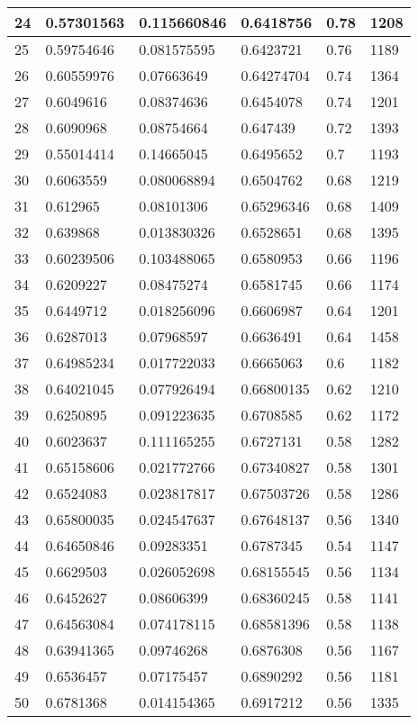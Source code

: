 \begin{longtable}{|l|l|l|l|l|l|}
24 & 0.57301563 & 0.115660846 & 0.6418756 & 0.78 & 1208 \\ \hline 
25 & 0.59754646 & 0.081575595 & 0.6423721 & 0.76 & 1189 \\ \hline 
26 & 0.60559976 & 0.07663649 & 0.64274704 & 0.74 & 1364 \\ \hline 
27 & 0.6049616 & 0.08374636 & 0.6454078 & 0.74 & 1201 \\ \hline 
28 & 0.6090968 & 0.08754664 & 0.647439 & 0.72 & 1393 \\ \hline 
29 & 0.55014414 & 0.14665045 & 0.6495652 & 0.7 & 1193 \\ \hline 
30 & 0.6063559 & 0.080068894 & 0.6504762 & 0.68 & 1219 \\ \hline 
31 & 0.612965 & 0.08101306 & 0.65296346 & 0.68 & 1409 \\ \hline 
32 & 0.639868 & 0.013830326 & 0.6528651 & 0.68 & 1395 \\ \hline 
33 & 0.60239506 & 0.103488065 & 0.6580953 & 0.66 & 1196 \\ \hline 
34 & 0.6209227 & 0.08475274 & 0.6581745 & 0.66 & 1174 \\ \hline 
35 & 0.6449712 & 0.018256096 & 0.6606987 & 0.64 & 1201 \\ \hline 
36 & 0.6287013 & 0.07968597 & 0.6636491 & 0.64 & 1458 \\ \hline 
37 & 0.64985234 & 0.017722033 & 0.6665063 & 0.6 & 1182 \\ \hline 
38 & 0.64021045 & 0.077926494 & 0.66800135 & 0.62 & 1210 \\ \hline 
39 & 0.6250895 & 0.091223635 & 0.6708585 & 0.62 & 1172 \\ \hline 
40 & 0.6023637 & 0.111165255 & 0.6727131 & 0.58 & 1282 \\ \hline 
41 & 0.65158606 & 0.021772766 & 0.67340827 & 0.58 & 1301 \\ \hline 
42 & 0.6524083 & 0.023817817 & 0.67503726 & 0.58 & 1286 \\ \hline 
43 & 0.65800035 & 0.024547637 & 0.67648137 & 0.56 & 1340 \\ \hline 
44 & 0.64650846 & 0.09283351 & 0.6787345 & 0.54 & 1147 \\ \hline 
45 & 0.6629503 & 0.026052698 & 0.68155545 & 0.56 & 1134 \\ \hline 
46 & 0.6452627 & 0.08606399 & 0.68360245 & 0.58 & 1141 \\ \hline 
47 & 0.64563084 & 0.074178115 & 0.68581396 & 0.58 & 1138 \\ \hline 
48 & 0.63941365 & 0.09746268 & 0.6876308 & 0.56 & 1167 \\ \hline 
49 & 0.6536457 & 0.07175457 & 0.6890292 & 0.56 & 1181 \\ \hline 
50 & 0.6781368 & 0.014154365 & 0.6917212 & 0.56 & 1335 \\ \hline 
\end{longtable}